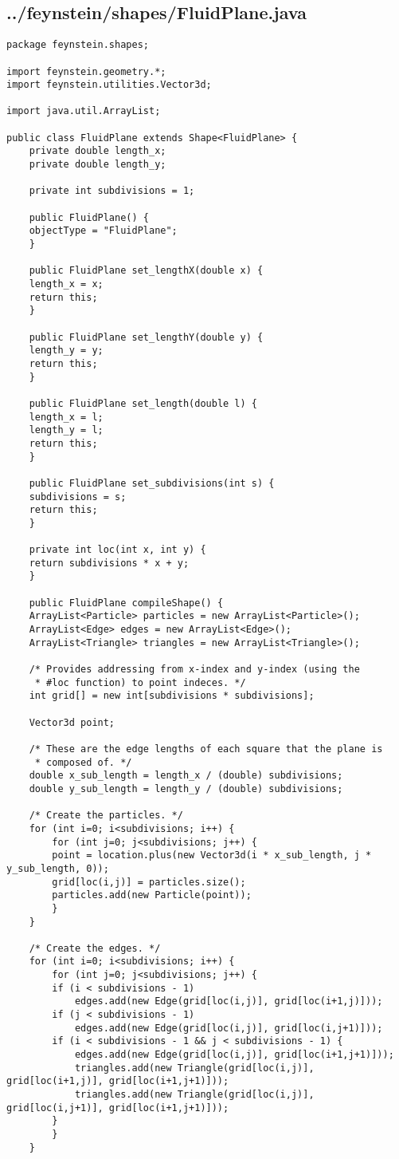 \subsection*{../feynstein/shapes/FluidPlane.java}
\begin{lstlisting}
package feynstein.shapes;

import feynstein.geometry.*;
import feynstein.utilities.Vector3d;

import java.util.ArrayList;

public class FluidPlane extends Shape<FluidPlane> {
    private double length_x;
    private double length_y;

    private int subdivisions = 1;

    public FluidPlane() {
	objectType = "FluidPlane";
    }

    public FluidPlane set_lengthX(double x) {
	length_x = x;
	return this;
    }

    public FluidPlane set_lengthY(double y) {
	length_y = y;
	return this;
    }

    public FluidPlane set_length(double l) {
	length_x = l;
	length_y = l;
	return this;
    }

    public FluidPlane set_subdivisions(int s) {
	subdivisions = s;
	return this;
    }

    private int loc(int x, int y) {
	return subdivisions * x + y;
    }

    public FluidPlane compileShape() {
	ArrayList<Particle> particles = new ArrayList<Particle>();
	ArrayList<Edge> edges = new ArrayList<Edge>();
	ArrayList<Triangle> triangles = new ArrayList<Triangle>();

	/* Provides addressing from x-index and y-index (using the
	 * #loc function) to point indeces. */
	int grid[] = new int[subdivisions * subdivisions];

	Vector3d point;

	/* These are the edge lengths of each square that the plane is
	 * composed of. */
	double x_sub_length = length_x / (double) subdivisions;
	double y_sub_length = length_y / (double) subdivisions;

	/* Create the particles. */
	for (int i=0; i<subdivisions; i++) {
	    for (int j=0; j<subdivisions; j++) {
		point = location.plus(new Vector3d(i * x_sub_length, j * y_sub_length, 0));
		grid[loc(i,j)] = particles.size();
		particles.add(new Particle(point));
	    }
	}

	/* Create the edges. */
	for (int i=0; i<subdivisions; i++) {
	    for (int j=0; j<subdivisions; j++) {
		if (i < subdivisions - 1)
		    edges.add(new Edge(grid[loc(i,j)], grid[loc(i+1,j)]));
		if (j < subdivisions - 1)
		    edges.add(new Edge(grid[loc(i,j)], grid[loc(i,j+1)]));
		if (i < subdivisions - 1 && j < subdivisions - 1) {
		    edges.add(new Edge(grid[loc(i,j)], grid[loc(i+1,j+1)]));
		    triangles.add(new Triangle(grid[loc(i,j)], grid[loc(i+1,j)], grid[loc(i+1,j+1)]));
		    triangles.add(new Triangle(grid[loc(i,j)], grid[loc(i,j+1)], grid[loc(i+1,j+1)]));
		}
	    }
	}


\end{lstlisting}
